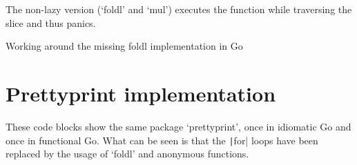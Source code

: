 The non-lazy version (`foldl' and `mul') executes the function while traversing the slice and thus panics.

\begin{code}
	\caption{Working around the missing foldl implementation in Go\label{code:foldl-go}}
\end{code}

\section{Prettyprint implementation}\label{appendix:prettyprint-func}

These code blocks show the same package `prettyprint', once in idiomatic Go and once
in functional Go. What can be seen is that the \texttt|for| loops have been replaced
by the usage of `foldl' and anonymous functions.

